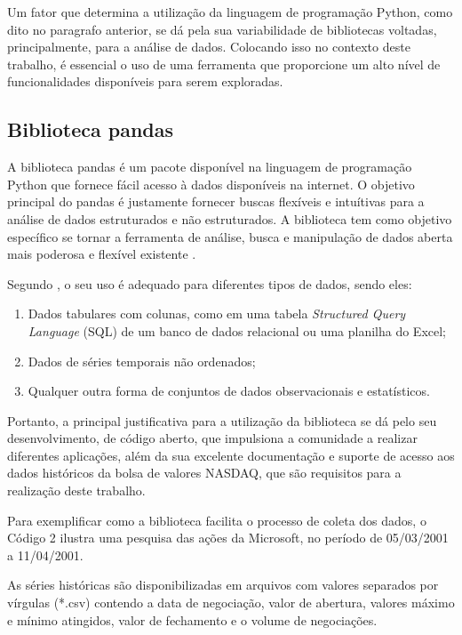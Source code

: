 Um fator que determina a utilização da linguagem de programação Python, como dito no paragrafo anterior, se dá pela sua variabilidade de bibliotecas voltadas, principalmente, para a análise de dados. Colocando isso no contexto deste trabalho, é essencial o uso de uma ferramenta que proporcione um alto nível de funcionalidades disponíveis para serem exploradas.

\subsection{Biblioteca pandas}\label{pandas-lib}
A biblioteca pandas é um pacote disponível na linguagem de programação Python que fornece fácil acesso à dados disponíveis na internet. O objetivo principal do pandas é justamente fornecer buscas flexíveis e intuítivas para a análise de dados estruturados e não estruturados. A biblioteca tem como objetivo específico se tornar a ferramenta de análise, busca e manipulação de dados aberta mais poderosa e flexível existente \cite{pandas}.

Segundo , o seu uso é adequado para diferentes tipos de dados, sendo eles:
\begin{enumerate}
\item Dados tabulares com colunas, como em uma tabela \textit{Structured Query Language} (SQL) de um banco de dados relacional ou uma planilha do Excel;
\item Dados de séries temporais não ordenados;
\item Qualquer outra forma de conjuntos de dados observacionais e estatísticos.
\end{enumerate}

Portanto, a principal justificativa para a utilização da biblioteca se dá pelo seu desenvolvimento, de código aberto, que impulsiona a comunidade a realizar diferentes aplicações, além da sua excelente documentação e suporte de acesso aos dados históricos da bolsa de valores NASDAQ, que são requisitos para a realização deste trabalho.

Para exemplificar como a biblioteca facilita o processo de coleta dos dados, o Código 2 ilustra uma pesquisa das ações da Microsoft, no período de 05/03/2001 a 11/04/2001.
\codigoPython\


As séries históricas são disponibilizadas em arquivos com valores separados por vírgulas (*.csv) contendo a data de negociação, valor de abertura, valores máximo e mínimo atingidos, valor de fechamento e o volume de negociações.

